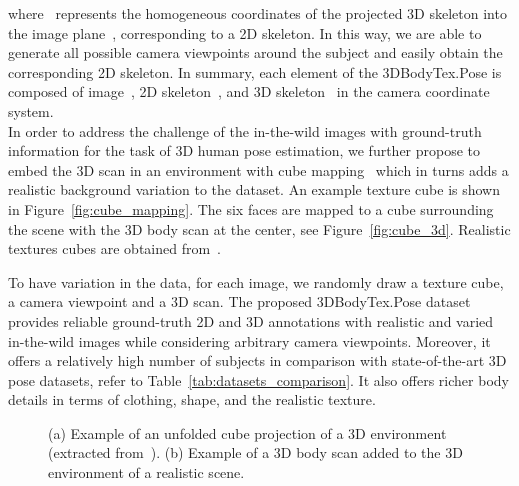 \documentclass{article}
\begin{document}
where~ represents the homogeneous coordinates of the projected 3D skeleton into the image plane~, corresponding to a 2D skeleton. In this way, we are able to generate all possible camera viewpoints around the subject and easily obtain the corresponding 2D skeleton. In summary, each element of the 3DBodyTex.Pose is composed of image~, 2D skeleton~, and 3D skeleton~ in the camera coordinate system.\\
 In order to address the challenge of the in-the-wild images with ground-truth information for the task of 3D human pose estimation, we further propose to embed the 3D scan in an environment with cube mapping~\cite{greene1986environment} which in turns adds a realistic background variation to the dataset. An example texture cube is shown in Figure~\ref{fig:cube_mapping}. The six faces are mapped to a cube surrounding the scene with the 3D body scan at the center, see Figure~\ref{fig:cube_3d}. Realistic textures cubes are obtained from~\cite{humus-cube}.

To have variation in the data, for each image, we randomly draw a texture cube, a camera viewpoint and a 3D scan. The proposed 3DBodyTex.Pose dataset provides reliable ground-truth 2D and 3D annotations with realistic and varied in-the-wild images while considering arbitrary camera viewpoints. Moreover, it offers a relatively high number of subjects in comparison with state-of-the-art 3D pose datasets, refer to Table~\ref{tab:datasets_comparison}. It also offers richer body details in terms of clothing, shape, and the realistic texture.

\begin{figure}[t]
    \vspace{-0.5cm}
	\centering 
    \; \; \;
    \vspace{-0.3cm}
    \caption{(a) Example of an unfolded cube projection of a 3D environment (extracted from~\cite{humus-cube}). (b) Example of a 3D body scan added to the 3D environment of a realistic scene.}
    \label{fig:all_cube_3d}
    \vspace{-0.2cm}
\end{figure}


\vspace{-0.1cm}
\end{document}
